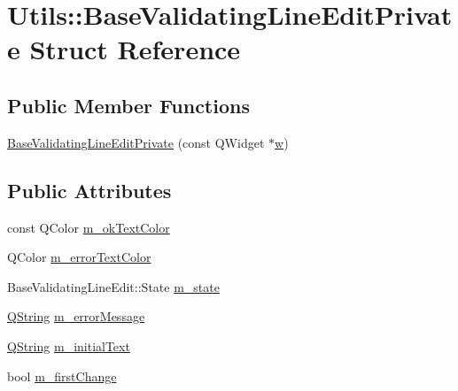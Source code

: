 \hypertarget{struct_utils_1_1_base_validating_line_edit_private}{\section{Utils\-:\-:Base\-Validating\-Line\-Edit\-Private Struct Reference}
\label{struct_utils_1_1_base_validating_line_edit_private}
}
\subsection*{Public Member Functions}
\begin{DoxyCompactItemize}
\item 
\hyperlink{struct_utils_1_1_base_validating_line_edit_private_a68effbe5d629bc89b20d768bcf6e336b}{Base\-Validating\-Line\-Edit\-Private} (const Q\-Widget $\ast$\hyperlink{glext_8h_ac1795f3b2fee217274b85c2750e1a889}{w})
\end{DoxyCompactItemize}
\subsection*{Public Attributes}
\begin{DoxyCompactItemize}
\item 
const Q\-Color \hyperlink{struct_utils_1_1_base_validating_line_edit_private_a93a0919e984d20572667722990e1f3ec}{m\-\_\-ok\-Text\-Color}
\item 
Q\-Color \hyperlink{struct_utils_1_1_base_validating_line_edit_private_aaa0cb150a25e8081973452da11520ca8}{m\-\_\-error\-Text\-Color}
\item 
Base\-Validating\-Line\-Edit\-::\-State \hyperlink{struct_utils_1_1_base_validating_line_edit_private_a5f2abc5b382f1099afcd254f43460031}{m\-\_\-state}
\item 
\hyperlink{group___u_a_v_objects_plugin_gab9d252f49c333c94a72f97ce3105a32d}{Q\-String} \hyperlink{struct_utils_1_1_base_validating_line_edit_private_a33100a5d6d547b5de11a0c27dc28201c}{m\-\_\-error\-Message}
\item 
\hyperlink{group___u_a_v_objects_plugin_gab9d252f49c333c94a72f97ce3105a32d}{Q\-String} \hyperlink{struct_utils_1_1_base_validating_line_edit_private_a8e2897fda859a5d9d1d8d5c02fd72c85}{m\-\_\-initial\-Text}
\item 
bool \hyperlink{struct_utils_1_1_base_validating_line_edit_private_aa380be78e3a48cb452f02706411f99f9}{m\-\_\-first\-Change}
\end{DoxyCompactItemize}


